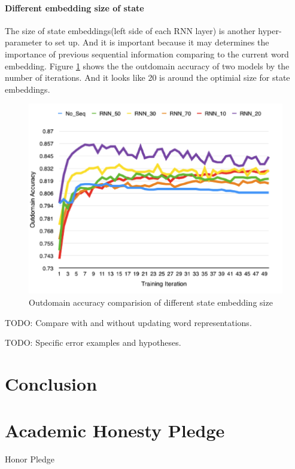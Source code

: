 \documentclass[11pt]{article}
\begin{document}
\paragraph{Different embedding size of state}
The size of state embeddings(left side of each RNN layer) is another hyper-parameter to set up. And it is important because it may determines the importance of previous sequential information comparing to the current word embedding. Figure \ref{Leftsize_fig} shows the the outdomain accuracy of two models by the number of iterations. And it looks like 20 is around the optimial size for state embeddings.
\begin{figure}
	\includegraphics[scale=0.5]{outdomain_leftsize.png}
	\caption{Outdomain accuracy comparision of different state embedding size} \label{Leftsize_fig}
\end{figure}

TODO: Compare with and without updating word representations.


TODO: Specific error examples and hypotheses.





\section{Conclusion}

\section{Academic Honesty Pledge}

Honor Pledge
\end{document}
